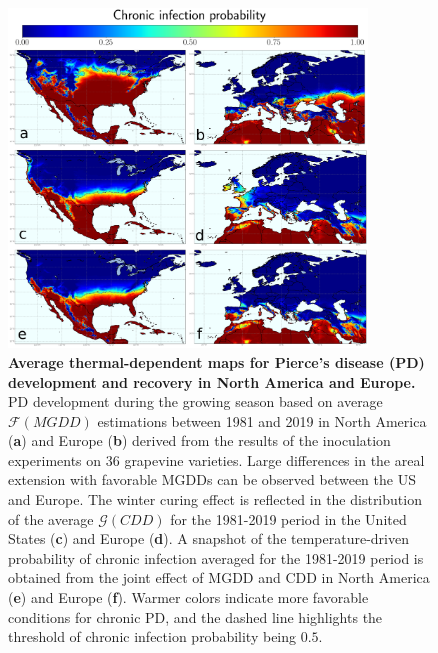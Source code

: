     \begin{figure}[H]
        \centering
        \includegraphics[width=0.85\textwidth]{Figures/Fig2.pdf}
        \caption[Average thermal-dependent maps for Pierce's disease
            (PD) development and recovery]{\textbf{Average
                thermal-dependent maps for Pierce's disease
                (PD)
                development and recovery in North America and Europe.} PD
            development during
            the growing season based on average $\mathcal{F}(MGDD)$ estimations
            between
            1981 and 2019 in North America (\textbf{a}) and Europe (\textbf{b})
            derived
            from the results of the inoculation experiments on 36 grapevine
            varieties.
            Large differences in the areal extension with favorable MGDDs can
            be observed
            between the US and Europe. The winter curing effect is reflected in
            the
            distribution of the average $\mathcal{G}(CDD)$ for the 1981-2019
            period in the
            United States (\textbf{c}) and Europe (\textbf{d}). A snapshot of
            the
            temperature-driven probability of chronic infection averaged for
            the 1981-2019
            period is obtained from the joint effect of MGDD and CDD in North
            America
            (\textbf{e}) and Europe (\textbf{f}). Warmer colors indicate more
            favorable
            conditions for chronic PD, and the dashed line highlights the
            threshold of
            chronic infection probability being $0.5$.}
        \label{fig2}
    \end{figure}

